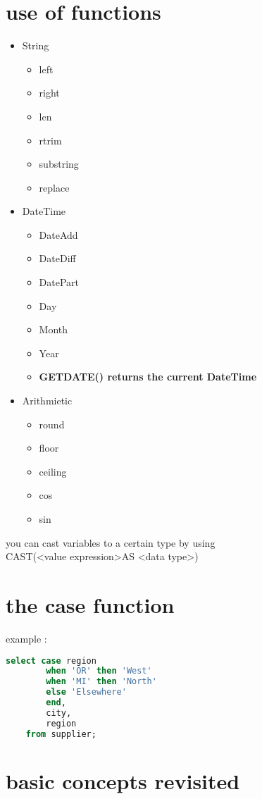 \documentclass{report}
\begin{document}
	\section{use of functions}
	\begin{itemize}
		\item String
		\begin{itemize}
			\item left
			\item right
			\item len
			\item rtrim
			\item substring
			\item replace
		\end{itemize}
	\pagebreak
		\item DateTime
		\begin{itemize}
			\item DateAdd
			\item DateDiff
			\item DatePart
			\item Day
			\item Month
			\item Year
			\item \textbf{GETDATE() returns the current DateTime}
		\end{itemize}
		\item Arithmietic
		\begin{itemize}
			\item round
			\item floor
			\item ceiling
			\item cos
			\item sin
		\end{itemize}
	\end{itemize}
	you can cast variables to a certain type by using \\ CAST(\textless value expression\textgreater AS \textless data type\textgreater)
	\section{the case function}
	example : 
	\begin{lstlisting}[language=SQL]
	select case region 
		when 'OR' then 'West' 
		when 'MI' then 'North' 
		else 'Elsewhere' 
		end,
		city,
		region
	from supplier;\end{lstlisting}
	\pagebreak
	\section{basic concepts revisited}
\end{document}
